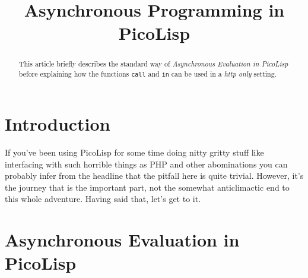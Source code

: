 \title{Asynchronous Programming in PicoLisp}

\maketitle





% 

\begin{abstract}
  This article briefly describes the standard way of
  \emph{Asynchronous Evaluation in PicoLisp} before explaining how the
  functions \texttt{call} and \texttt{in} can be used in a \emph{http
    only} setting. 
\end{abstract}


\section{Introduction}
\label{sec:bla}

If you've been using PicoLisp for some time doing nitty gritty stuff
like interfacing with such horrible things as PHP and other
abominations you can probably infer from the headline that the pitfall
here is quite trivial. However, it's the journey that is the important
part, not the somewhat anticlimactic end to this whole adventure.
Having said that, let's get to it.


\section{Asynchronous Evaluation in PicoLisp}
\label{sec:bal}

